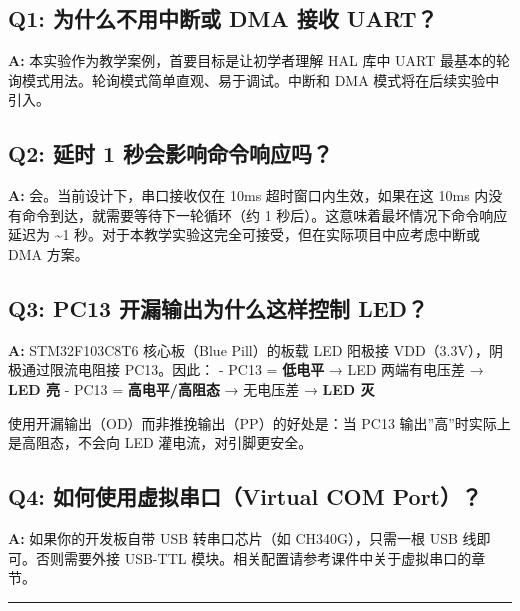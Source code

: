 \documentclass[
  chinese,
  UTF8,
  oneside,
  openany]{ctexbook}
\begin{document}
\subsection{Q1: 为什么不用中断或 DMA 接收
UART？}\label{q1-ux4e3aux4ec0ux4e48ux4e0dux7528ux4e2dux65adux6216-dma-ux63a5ux6536-uart}

\textbf{A:} 本实验作为教学案例，首要目标是让初学者理解 HAL 库中 UART
最基本的轮询模式用法。轮询模式简单直观、易于调试。中断和 DMA
模式将在后续实验中引入。

\subsection{Q2: 延时 1
秒会影响命令响应吗？}\label{q2-ux5ef6ux65f6-1-ux79d2ux4f1aux5f71ux54cdux547dux4ee4ux54cdux5e94ux5417}

\textbf{A:} 会。当前设计下，串口接收仅在 10ms 超时窗口内生效，如果在这
10ms 内没有命令到达，就需要等待下一轮循环（约 1
秒后）。这意味着最坏情况下命令响应延迟为 \textasciitilde1
秒。对于本教学实验这完全可接受，但在实际项目中应考虑中断或 DMA 方案。

\subsection{Q3: PC13 开漏输出为什么这样控制
LED？}\label{q3-pc13-ux5f00ux6f0fux8f93ux51faux4e3aux4ec0ux4e48ux8fd9ux6837ux63a7ux5236-led}

\textbf{A:} STM32F103C8T6 核心板（Blue Pill）的板载 LED 阳极接
VDD（3.3V），阴极通过限流电阻接 PC13。因此： - PC13 = \textbf{低电平} →
LED 两端有电压差 → \textbf{LED 亮} - PC13 = \textbf{高电平/高阻态} →
无电压差 → \textbf{LED 灭}

使用开漏输出（OD）而非推挽输出（PP）的好处是：当 PC13
输出''高''时实际上是高阻态，不会向 LED 灌电流，对引脚更安全。

\subsection{Q4: 如何使用虚拟串口（Virtual COM
Port）？}\label{q4-ux5982ux4f55ux4f7fux7528ux865aux62dfux4e32ux53e3virtual-com-port}

\textbf{A:} 如果你的开发板自带 USB 转串口芯片（如 CH340G），只需一根 USB
线即可。否则需要外接 USB-TTL
模块。相关配置请参考课件中关于虚拟串口的章节。

\begin{center}\rule{0.5\linewidth}{0.5pt}\end{center}
\end{document}

